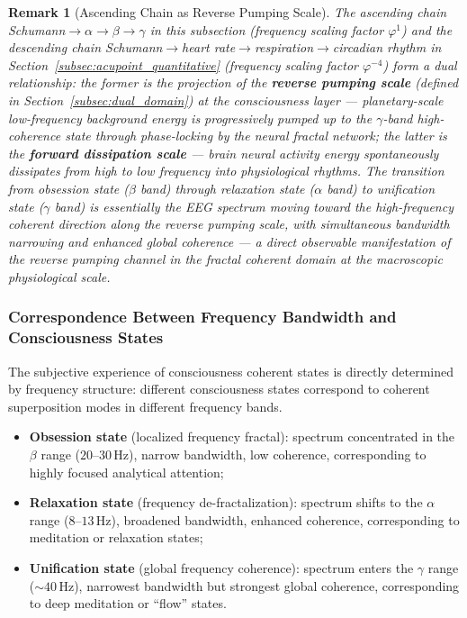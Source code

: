 \documentclass[12pt,a4paper,twocolumn]{article}
\renewcommand{\phi}{\varphi}
\newtheorem{remark}[theorem]{Remark}
\begin{document}
\begin{remark}[Ascending Chain as Reverse Pumping Scale]
\label{rmk:ascending_reverse_pump}
The ascending chain Schumann$\to\alpha\to\beta\to\gamma$ in this subsection (frequency scaling factor $\phi^{1}$) and the descending chain Schumann$\to$heart rate$\to$respiration$\to$circadian rhythm in Section~\ref{subsec:acupoint_quantitative} (frequency scaling factor $\phi^{-4}$) form a dual relationship: the former is the projection of the \textbf{reverse pumping scale} (defined in Section~\ref{subsec:dual_domain}) at the consciousness layer --- planetary-scale low-frequency background energy is progressively pumped up to the $\gamma$-band high-coherence state through phase-locking by the neural fractal network; the latter is the \textbf{forward dissipation scale} --- brain neural activity energy spontaneously dissipates from high to low frequency into physiological rhythms. The transition from obsession state ($\beta$ band) through relaxation state ($\alpha$ band) to unification state ($\gamma$ band) is essentially the EEG spectrum moving toward the high-frequency coherent direction along the reverse pumping scale, with simultaneous bandwidth narrowing and enhanced global coherence --- a direct observable manifestation of the reverse pumping channel in the fractal coherent domain at the macroscopic physiological scale.
\end{remark}

\subsubsection{Correspondence Between Frequency Bandwidth and Consciousness States}
The subjective experience of consciousness coherent states is directly determined by frequency structure: different consciousness states correspond to coherent superposition modes in different frequency bands.
\begin{itemize}
\item \textbf{Obsession state} (localized frequency fractal): spectrum concentrated in the $\beta$ range ($20$--$30$\,Hz), narrow bandwidth, low coherence, corresponding to highly focused analytical attention;
\item \textbf{Relaxation state} (frequency de-fractalization): spectrum shifts to the $\alpha$ range ($8$--$13$\,Hz), broadened bandwidth, enhanced coherence, corresponding to meditation or relaxation states;
\item \textbf{Unification state} (global frequency coherence): spectrum enters the $\gamma$ range ($\sim 40$\,Hz), narrowest bandwidth but strongest global coherence, corresponding to deep meditation or ``flow'' states.
\end{itemize}
\end{document}
